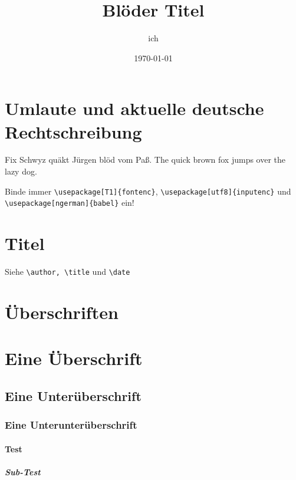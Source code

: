 \documentclass[a4paper]{article}
\title{Blöder Titel}
\author{ich}
\date{\today}
\begin{document}
\section{Umlaute und aktuelle deutsche Rechtschreibung}
Fix Schwyz quäkt Jürgen blöd vom Paß.
The quick brown fox jumps over the lazy dog.

Binde immer \verb+\usepackage[T1]{fontenc}+, \verb+\usepackage[utf8]{inputenc}+ und \verb+\usepackage[ngerman]{babel}+ ein!

\section{Titel}
\maketitle %

Siehe \verb+\author, \title+ und \verb+\date+

\section{Überschriften}

\section{Eine Überschrift}
\subsection{Eine Unterüberschrift}
\subsubsection{Eine Unterunterüberschrift}
\paragraph{Test}
\subparagraph{Sub-Test}

\tableofcontents
\end{document}
